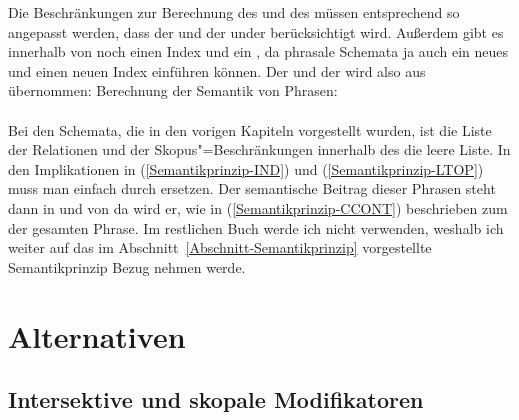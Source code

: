 \noindent
Die Beschränkungen zur Berechnung des \relswes und des \hconswes müssen entsprechend so angepasst
werden, dass der \relsw und der \hconsw under \ccont berücksichtigt wird. Außerdem gibt es innerhalb
von \ccont noch einen Index und ein \ltop, da phrasale Schemata ja auch ein neues \ltop und einen
neuen Index einführen können. Der \indw und der \ltopw wird also aus \ccont übernommen:   
\eas
\label{Semantikprinzip-CCONT}%
Berechnung der Semantik von Phrasen:\\
 \impl\\
\zs
Bei den Schemata, die in den vorigen  Kapiteln vorgestellt wurden, ist die Liste der Relationen und
der Skopus"=Beschränkungen innerhalb des \ccontwes die leere Liste. In den Implikationen in (\ref{Semantikprinzip-IND})
und (\ref{Semantikprinzip-LTOP}) muss man \cont einfach durch \ccont ersetzen. Der semantische Beitrag dieser Phrasen
steht dann in \ccont und von da wird er, wie in (\ref{Semantikprinzip-CCONT}) beschrieben zum \contw
der gesamten Phrase. Im restlichen Buch werde ich \ccont nicht verwenden, weshalb ich weiter auf das
im Abschnitt~\ref{Abschnitt-Semantikprinzip} vorgestellte Semantikprinzip Bezug nehmen werde.




\section{Alternativen}

\subsection{Intersektive und skopale Modifikatoren}

